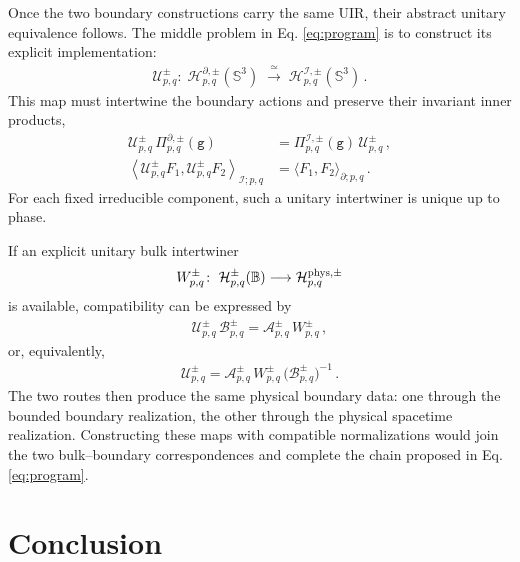 \documentclass{SciPost}
\begin{document}
Once the two boundary constructions carry the same UIR, their abstract unitary equivalence follows. The middle problem in Eq. \eqref{eq:program} is to construct its explicit implementation:
\begin{align}
    {\mathcal U}_{p,q}^{\pm}\colon\;
    {\mathcal H}_{p,q}^{\partial,\pm}(\mathbb S^3)
    \;\xrightarrow{\;\simeq\;}\;
    {\mathcal H}_{p,q}^{\mathscr I,\pm}(\mathbb S^3) \,.
\end{align}
This map must intertwine the boundary actions and
preserve their invariant inner products,
\begin{align}
    {\mathcal U}_{p,q}^{\pm}\,
    \Pi_{p,q}^{\partial,\pm}(\texttt{g})
    &=
    \Pi_{p,q}^{\mathscr I,\pm}(\texttt{g})\,
    {\mathcal U}_{p,q}^{\pm} \,,
    \\[3pt]
    \left\langle
        {\mathcal U}_{p,q}^{\pm}F_1,
        {\mathcal U}_{p,q}^{\pm}F_2
    \right\rangle_{\mathscr I;p,q}
    &=
    \langle F_1,F_2\rangle_{\partial;p,q} \,.
\end{align}
For each fixed irreducible component, such a unitary intertwiner is unique up to phase.

If an explicit unitary bulk intertwiner
\begin{align}
    W_{p,q}^{\pm}\colon\;
    {\mathcal H}_{p,q}^{\pm}(\mathbb B)
    \longrightarrow
    {\cal H}_{p,q}^{{\rm phys},\pm}
\end{align}
is available, compatibility can be expressed by
\begin{align}
    {\mathcal U}_{p,q}^{\pm}\,
    {\mathcal B}_{p,q}^{\pm}
    =
    {\mathcal A}_{p,q}^{\pm}\,
    W_{p,q}^{\pm} \,,
\end{align}
or, equivalently,
\begin{align}
    {\mathcal U}_{p,q}^{\pm}
    =
    {\mathcal A}_{p,q}^{\pm}\,
    W_{p,q}^{\pm}\,
    \bigl({\mathcal B}_{p,q}^{\pm}\bigr)^{-1} \,.
\end{align}
The two routes then produce the same physical boundary data: one through the bounded boundary realization, the other through the physical spacetime realization. Constructing these maps with compatible normalizations would join the two bulk--boundary correspondences and complete the chain proposed in Eq. \eqref{eq:program}.


\section{Conclusion}
\end{document}
